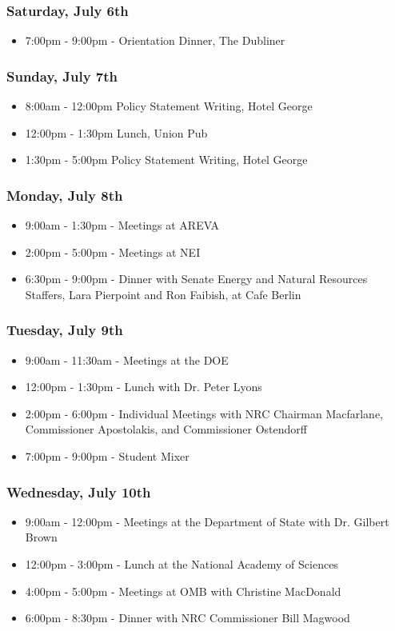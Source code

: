 \subsubsection*{Saturday, July 6th}
\begin{itemize}
  \item 7:00pm - 9:00pm - Orientation Dinner, The Dubliner
\end{itemize}

\subsubsection*{Sunday, July 7th}
\begin{itemize}
  \item 8:00am - 12:00pm Policy Statement Writing, Hotel George
  \item 12:00pm - 1:30pm Lunch, Union Pub
  \item 1:30pm - 5:00pm Policy Statement Writing, Hotel George
\end{itemize}

\subsubsection*{Monday, July 8th}
\begin{itemize}
  \item 9:00am - 1:30pm - Meetings at AREVA
  \item 2:00pm - 5:00pm - Meetings at NEI
  \item 6:30pm - 9:00pm - Dinner with Senate Energy and Natural Resources
    Staffers, Lara Pierpoint and Ron Faibish, at Cafe Berlin
\end{itemize}

\subsubsection*{Tuesday, July 9th}
\begin{itemize}
  \item 9:00am - 11:30am - Meetings at the DOE
  \item 12:00pm - 1:30pm - Lunch with Dr. Peter Lyons
  \item 2:00pm - 6:00pm - Individual Meetings with NRC Chairman Macfarlane,
    Commissioner Apostolakis, and Commissioner Ostendorff
  \item 7:00pm - 9:00pm - Student Mixer
\end{itemize}

\subsubsection*{Wednesday, July 10th}
\begin{itemize}
  \item 9:00am - 12:00pm - Meetings at the Department of State with Dr. Gilbert
    Brown
  \item 12:00pm - 3:00pm - Lunch at the National Academy of Sciences
  \item 4:00pm - 5:00pm - Meetings at OMB with Christine MacDonald
  \item 6:00pm - 8:30pm - Dinner with NRC Commissioner Bill Magwood
\end{itemize}


